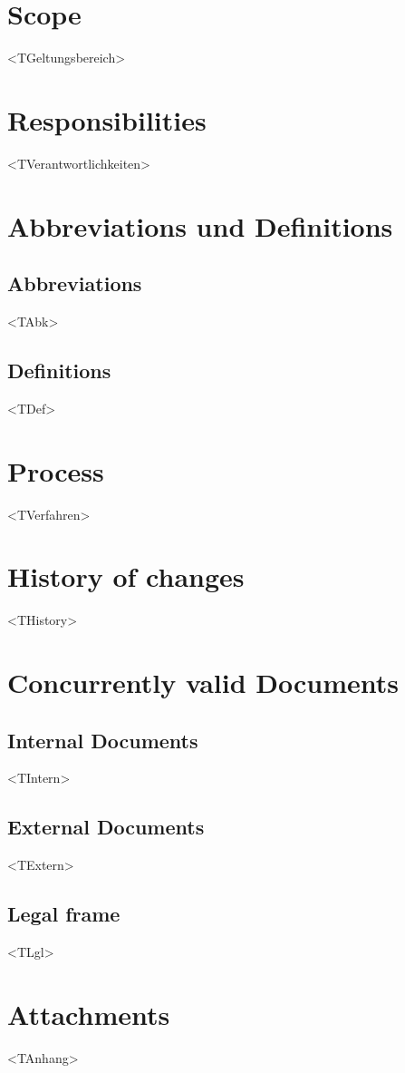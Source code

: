 \documentclass[a4paper,10pt,oneside,notitlepage]{article}
\begin{document}
\section{Scope}
<TGeltungsbereich>


\section{Responsibilities}
<TVerantwortlichkeiten>


\section{Abbreviations und Definitions}
\subsection{Abbreviations}
<TAbk>

\subsection{Definitions}
<TDef>


\section{Process}
<TVerfahren>


\section{History of changes}
<THistory>

\section{Concurrently valid Documents}
\subsection{Internal Documents}
<TIntern>
\subsection{External Documents}
<TExtern>
\subsection{Legal frame}
<TLgl>

\newpage

\appendix
\section{Attachments}
<TAnhang>
\end{document}

